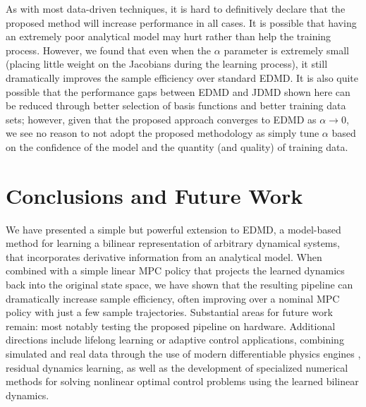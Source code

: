 \documentclass{article}
\begin{document}
As with most data-driven techniques, it is hard to definitively declare that the proposed 
method will increase performance in all cases. It is possible that having an extremely poor
analytical model may hurt rather than help the training process. However, we found that even
when the $\alpha$ parameter is extremely small (placing little weight on the Jacobians 
during the learning process), it still dramatically improves the sample efficiency over 
standard EDMD. It is also quite possible that the performance gaps between EDMD and JDMD
shown here can be reduced through better selection of basis functions and better training
data sets; however, given that the proposed approach converges to EDMD as $\alpha
\rightarrow 0$, we see no reason to not adopt the proposed methodology as simply tune
$\alpha$ based on the confidence of the model and the quantity (and quality) of training
data.


\section{Conclusions and Future Work} \label{sec:conclusion}

We have presented a simple but powerful extension to EDMD, a model-based method for learning
a bilinear representation of arbitrary dynamical systems, that incorporates derivative
information from an analytical model. When combined with a simple linear MPC policy that
projects the learned dynamics back into the original state space, we have shown that the
resulting pipeline can dramatically increase sample efficiency, often improving over a
nominal MPC policy with just a few sample trajectories. Substantial areas for future work
remain: most notably testing the proposed pipeline on hardware. Additional directions
include lifelong learning or adaptive control applications, combining simulated and real
data through the use of modern differentiable physics engines \cite{Howell2022,Todorov2012},
residual dynamics learning, as well as the development of specialized numerical methods for
solving nonlinear optimal control problems using the learned bilinear dynamics.


\end{document}
